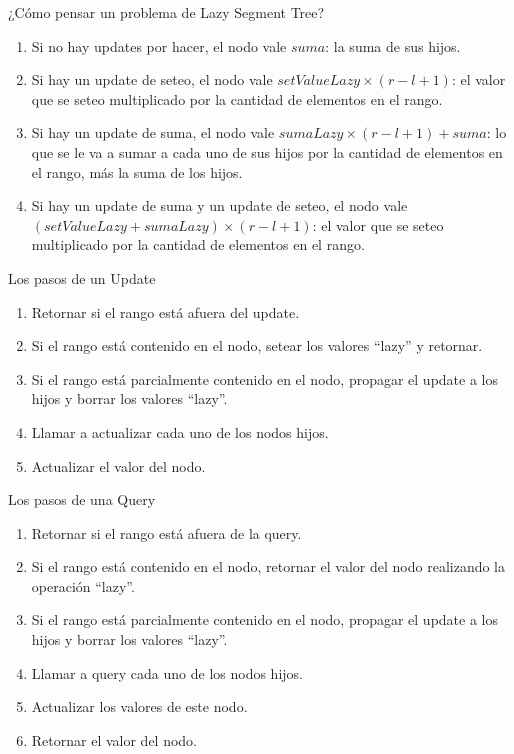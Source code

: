 \documentclass{beamer}
\begin{document}
\begin{frame}{¿Cómo pensar un problema de Lazy Segment Tree?}
\begin{enumerate}
    \item Si no hay updates por hacer, el nodo vale $suma$: la suma de sus hijos.
    \pause
    \item Si hay un update de seteo, el nodo vale $setValueLazy \times (r-l+1)$: el valor que se seteo multiplicado por la cantidad de elementos en el rango.
    \pause
    \item Si hay un update de suma, el nodo vale $sumaLazy \times (r-l+1) + suma$: lo que se le va a sumar a cada uno de sus hijos por la cantidad de elementos en el rango, más la suma de los hijos.
    \pause
    \item Si hay un update de suma y un update de seteo, el nodo vale $(setValueLazy  + sumaLazy) \times (r-l+1)$: el valor que se seteo multiplicado por la cantidad de elementos en el rango.
\end{enumerate}
\end{frame}

\begin{frame}{Los pasos de un Update}
\begin{enumerate}
    \item Retornar si el rango está afuera del update.
    \pause
    \item Si el rango está contenido en el nodo, setear los valores ``lazy'' y retornar.
    \pause
    \item Si el rango está parcialmente contenido en el nodo, propagar el update a los hijos y borrar los valores ``lazy''.
    \pause
    \item Llamar a actualizar cada uno de los nodos hijos.
    \pause
    \item Actualizar el valor del nodo.
\end{enumerate}
\end{frame}


\begin{frame}{Los pasos de una Query}
\begin{enumerate}
    \item Retornar si el rango está afuera de la query.
    \pause
    \item Si el rango está contenido en el nodo, retornar el valor del nodo realizando la operación ``lazy''.
    \pause
    \item Si el rango está parcialmente contenido en el nodo, propagar el update a los hijos y borrar los valores ``lazy''.
    \pause
    \item Llamar a query cada uno de los nodos hijos.
    \pause
    \item Actualizar los valores de este nodo.
    \pause
    \item Retornar el valor del nodo.
\end{enumerate}
\end{frame}
\end{document}
